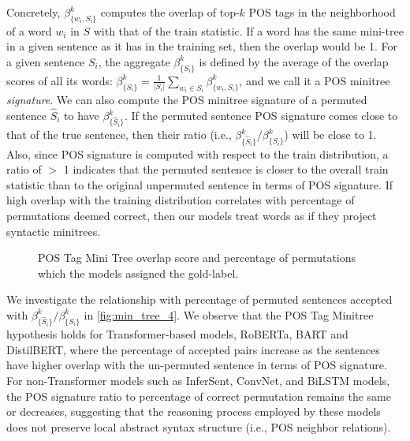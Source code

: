 \documentclass[11pt,a4paper]{article}
\begin{document}
Concretely, $\beta^k_{\{w_i,S_i\}}$ computes the overlap of top-$k$ POS tags in the neighborhood of a word $w_i$ in $S$ with that of the train statistic. If a word has the same mini-tree in a given sentence as it has in the training set, then the overlap would be 1. For a given sentence $S_i$, the aggregate $\beta^k_{\{S_i\}}$ is defined by the average of the overlap scores of all its words: $\beta^k_{\{S_i\}} = \frac{1}{|S_i|}\sum_{w_i \in S_i} \beta^k_{\{w_i,S_i\}}$, and we call it a POS minitree \textit{signature}. We can also compute the POS minitree signature of a permuted sentence $\hat{S}_i$ to have $\beta^k_{\{\hat{S}_i\}}$.  If the permuted sentence POS signature comes close to that of the true sentence, then their ratio (i.e.,  $\beta^k_{\{\hat{S}_i\}} / \beta^k_{\{S_i\}}$) will be close to 1. Also, since POS signature is computed with respect to the train distribution, a ratio of $>$ 1 indicates that the permuted sentence is closer to the overall train statistic than to the original unpermuted sentence in terms of POS signature. %
If  high overlap with the training distribution correlates with percentage of permutations deemed correct, then our models treat words as if they project syntactic minitrees. 

\begin{figure}[t]
    \centering
    \caption{POS Tag Mini Tree overlap score and  percentage of permutations which the models assigned the gold-label.}
    \label{fig:min_tree_4}
\end{figure}

We investigate the relationship with percentage of permuted sentences accepted with $\beta^k_{\{\hat{S}_i\}} / \beta^k_{\{S_i\}}$ in \autoref{fig:min_tree_4}. We observe that the POS Tag Minitree hypothesis holds for Transformer-based models, RoBERTa, BART and DistilBERT, where the percentage of accepted pairs increase as the sentences have higher overlap with the un-permuted sentence in terms of POS signature. For non-Transformer models such as InferSent, ConvNet, and BiLSTM models, the POS signature ratio to percentage of correct permutation remains the same or decreases, suggesting that the reasoning process employed by these models does not preserve local abstract syntax structure (i.e., POS neighbor relations).
\end{document}
